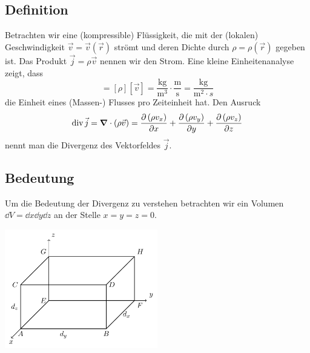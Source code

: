\documentclass[paper=a4, fontsize=11.0pt, abstractoff, DIV12]{scrartcl}
\begin{document}
\subsection{Definition}

Betrachten wir eine (kompressible) Flüssigkeit, die mit der (lokalen)
Geschwindigkeit $\vec v= \vec v(\vec r)$ strömt und deren Dichte durch $\rho
= \rho(\vec r)$ gegeben ist. Das Produkt $\vec j = \rho \vec v$ nennen wir den Strom. Eine kleine Einheitenanalyse zeigt, dass
\begin{equation*}
[\vec j] = [\rho][\vec v] = \frac{\mathrm{kg}}{\mathrm{m^3}}\cdot\frac{\mathrm{m}}{\mathrm{s}} = \frac{\mathrm{kg}}{\mathrm{m^2}\cdot{s}}
\end{equation*}
die Einheit eines (Massen-) Flusses pro Zeiteinheit hat. Den Ausruck
\begin{equation}
\div \vec j = \nabla\cdot(\rho \vec v) = \firstpderiv{\left(\rho v_x\right)}{x} + \firstpderiv{\left(\rho v_y\right)}{y} + \firstpderiv{\left(\rho v_z\right)}{z}
\end{equation}
nennt man die Divergenz des Vektorfeldes $\vec j$.

\subsection{Bedeutung}

Um die Bedeutung der Divergenz zu verstehen betrachten wir ein Volumen $\dd V = \dd x \dd y \dd z$ an der Stelle $x=y=z=0$.

\begin{center}
    \includegraphics[width=0.5\textwidth]{Figures/Div}
\end{center}
\end{document}
